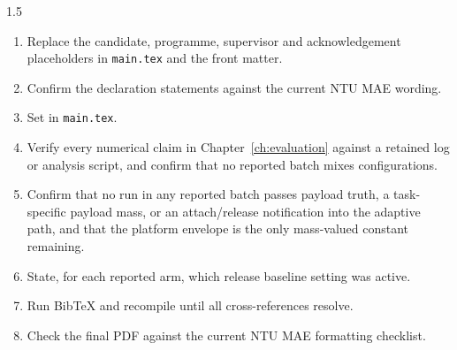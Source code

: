 \begin{appendices}
\begin{spacing}{1.5}
\begin{enumerate}
\item Replace the candidate, programme, supervisor and acknowledgement
placeholders in \texttt{main.tex} and the front matter.
\item Confirm the declaration statements against the current NTU MAE wording.
\item Set \texttt{\string\showdraftnotesfalse} in \texttt{main.tex}.
\item Verify every numerical claim in Chapter~\ref{ch:evaluation} against a
retained log or analysis script, and confirm that no reported batch mixes
configurations.
\item Confirm that no run in any reported batch passes payload truth, a
task-specific payload mass, or an attach/release notification into the adaptive
path, and that the platform envelope is the only mass-valued constant remaining.
\item State, for each reported arm, which release baseline setting was active.
\item Run BibTeX and recompile until all cross-references resolve.
\item Check the final PDF against the current NTU MAE formatting checklist.
\end{enumerate}
\end{spacing}

\end{appendices}
